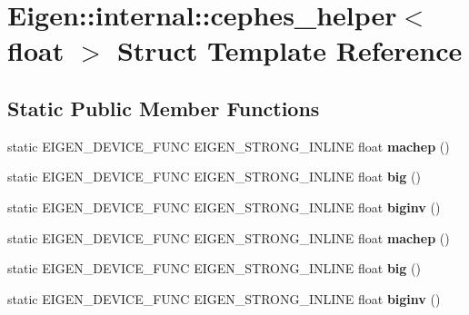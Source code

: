 \hypertarget{struct_eigen_1_1internal_1_1cephes__helper_3_01float_01_4}{}\section{Eigen\+:\+:internal\+:\+:cephes\+\_\+helper$<$ float $>$ Struct Template Reference}
\label{struct_eigen_1_1internal_1_1cephes__helper_3_01float_01_4}
\subsection*{Static Public Member Functions}
\begin{DoxyCompactItemize}
\item 
\mbox{\label{struct_eigen_1_1internal_1_1cephes__helper_3_01float_01_4_a2b65193337bc1a213286faed766fb663}} 
static E\+I\+G\+E\+N\+\_\+\+D\+E\+V\+I\+C\+E\+\_\+\+F\+U\+NC E\+I\+G\+E\+N\+\_\+\+S\+T\+R\+O\+N\+G\+\_\+\+I\+N\+L\+I\+NE float {\bfseries machep} ()
\item 
\mbox{\label{struct_eigen_1_1internal_1_1cephes__helper_3_01float_01_4_a231775f6e6bbfe9364b50735b6c35dec}} 
static E\+I\+G\+E\+N\+\_\+\+D\+E\+V\+I\+C\+E\+\_\+\+F\+U\+NC E\+I\+G\+E\+N\+\_\+\+S\+T\+R\+O\+N\+G\+\_\+\+I\+N\+L\+I\+NE float {\bfseries big} ()
\item 
\mbox{\label{struct_eigen_1_1internal_1_1cephes__helper_3_01float_01_4_a96e78e6f3e205fa8b7b557499fdb4e4d}} 
static E\+I\+G\+E\+N\+\_\+\+D\+E\+V\+I\+C\+E\+\_\+\+F\+U\+NC E\+I\+G\+E\+N\+\_\+\+S\+T\+R\+O\+N\+G\+\_\+\+I\+N\+L\+I\+NE float {\bfseries biginv} ()
\item 
\mbox{\label{struct_eigen_1_1internal_1_1cephes__helper_3_01float_01_4_a2b65193337bc1a213286faed766fb663}} 
static E\+I\+G\+E\+N\+\_\+\+D\+E\+V\+I\+C\+E\+\_\+\+F\+U\+NC E\+I\+G\+E\+N\+\_\+\+S\+T\+R\+O\+N\+G\+\_\+\+I\+N\+L\+I\+NE float {\bfseries machep} ()
\item 
\mbox{\label{struct_eigen_1_1internal_1_1cephes__helper_3_01float_01_4_a231775f6e6bbfe9364b50735b6c35dec}} 
static E\+I\+G\+E\+N\+\_\+\+D\+E\+V\+I\+C\+E\+\_\+\+F\+U\+NC E\+I\+G\+E\+N\+\_\+\+S\+T\+R\+O\+N\+G\+\_\+\+I\+N\+L\+I\+NE float {\bfseries big} ()
\item 
\mbox{\label{struct_eigen_1_1internal_1_1cephes__helper_3_01float_01_4_a96e78e6f3e205fa8b7b557499fdb4e4d}} 
static E\+I\+G\+E\+N\+\_\+\+D\+E\+V\+I\+C\+E\+\_\+\+F\+U\+NC E\+I\+G\+E\+N\+\_\+\+S\+T\+R\+O\+N\+G\+\_\+\+I\+N\+L\+I\+NE float {\bfseries biginv} ()
\end{DoxyCompactItemize}


